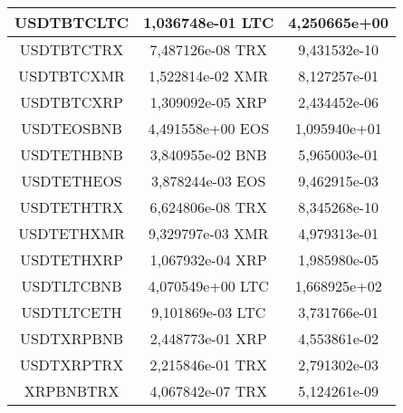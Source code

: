 \begin{table}
\begin{tabular}{|| c | c | c ||}
 \hline USDTBTCLTC & 1,036748e-01 LTC & 4,250665e+00\\ 
 \hline USDTBTCTRX & 7,487126e-08 TRX & 9,431532e-10\\ 
 \hline USDTBTCXMR & 1,522814e-02 XMR & 8,127257e-01\\ 
 \hline USDTBTCXRP & 1,309092e-05 XRP & 2,434452e-06\\ 
 \hline USDTEOSBNB & 4,491558e+00 EOS & 1,095940e+01\\ 
 \hline USDTETHBNB & 3,840955e-02 BNB & 5,965003e-01\\ 
 \hline USDTETHEOS & 3,878244e-03 EOS & 9,462915e-03\\ 
 \hline USDTETHTRX & 6,624806e-08 TRX & 8,345268e-10\\ 
 \hline USDTETHXMR & 9,329797e-03 XMR & 4,979313e-01\\ 
 \hline USDTETHXRP & 1,067932e-04 XRP & 1,985980e-05\\ 
 \hline USDTLTCBNB & 4,070549e+00 LTC & 1,668925e+02\\ 
 \hline USDTLTCETH & 9,101869e-03 LTC & 3,731766e-01\\ 
 \hline USDTXRPBNB & 2,448773e-01 XRP & 4,553861e-02\\ 
 \hline USDTXRPTRX & 2,215846e-01 TRX & 2,791302e-03\\ 
 \hline XRPBNBTRX & 4,067842e-07 TRX & 5,124261e-09\\ 
 \hline
\end{tabular}
\end{table}